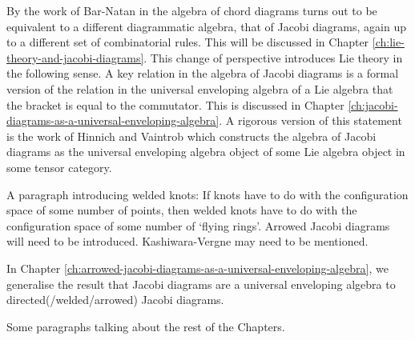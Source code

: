By the work of Bar-Natan in \cite{on-the-vassiliev-knot-invariants} the algebra of chord diagrams turns out to be equivalent to a different diagrammatic algebra, that of Jacobi diagrams, again up to a different set of combinatorial rules. This will be discussed in Chapter \ref{ch:lie-theory-and-jacobi-diagrams}. This change of perspective introduces Lie theory in the following sense. A key relation in the algebra of Jacobi diagrams is a formal version of the relation in the universal enveloping algebra of a Lie algebra that the bracket is equal to the commutator. This is discussed in Chapter \ref{ch:jacobi-diagrams-as-a-universal-enveloping-algebra}. A rigorous version of this statement is the work of Hinnich and Vaintrob \cite{cyclic-operads-and-the-algebra-of-chord-diagrams} which constructs the algebra of Jacobi diagrams as the universal enveloping algebra object of some Lie algebra object in some tensor category.

\begin{mdframed}
	A paragraph introducing welded knots: If knots have to do with the configuration space of some number of points, then welded knots have to do with the configuration space of some number of `flying rings'. Arrowed Jacobi diagrams will need to be introduced. Kashiwara-Vergne may need to be mentioned.
\end{mdframed}

In Chapter \ref{ch:arrowed-jacobi-diagrams-as-a-universal-enveloping-algebra}, we generalise the result that Jacobi diagrams are a universal enveloping algebra to directed(/welded/arrowed) Jacobi diagrams.

\begin{mdframed}
	Some paragraphs talking about the rest of the Chapters.
\end{mdframed}
